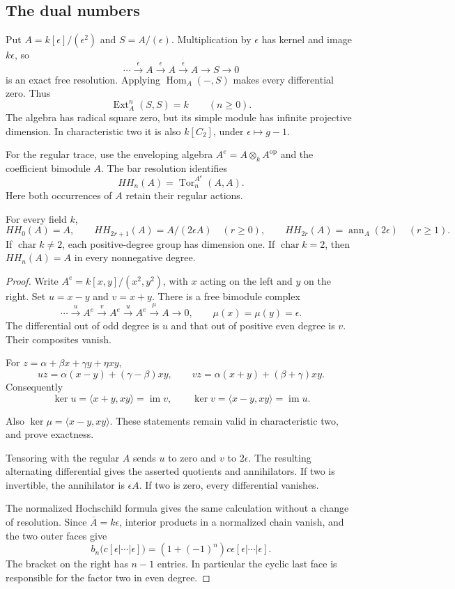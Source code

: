 \subsection{The dual numbers}

Put $A=k[\epsilon]/(\epsilon^2)$ and $S=A/(\epsilon)$. Multiplication by
$\epsilon$ has kernel and image $k\epsilon$, so
\[
 \cdots\xrightarrow{\epsilon} A\xrightarrow{\epsilon} A
 \xrightarrow{\epsilon} A\longrightarrow S\longrightarrow0
\]
is an exact free resolution. Applying $\operatorname{Hom}_A(-,S)$ makes
every differential zero. Thus
\[
 \operatorname{Ext}^n_A(S,S)=k\qquad(n\geq0).
\]
The algebra has radical square zero, but its simple module has infinite
projective dimension. In characteristic two it is also $k[C_2]$, under
$\epsilon\mapsto g-1$.

For the regular trace, use the enveloping algebra $A^e=A\otimes_k
A^{\mathrm{op}}$ and the coefficient bimodule $A$. The bar resolution
identifies
\[
 HH_n(A)=\operatorname{Tor}^{A^e}_n(A,A).
\]
Here both occurrences of $A$ retain their regular actions.

\begin{proposition}
\label{v4-arith:traces:dual-numbers}
For every field $k$,
\[
 HH_0(A)=A,\qquad
 HH_{2r+1}(A)=A/(2\epsilon A)\quad(r\geq0),\qquad
 HH_{2r}(A)=\operatorname{ann}_A(2\epsilon)\quad(r\geq1).
\]
If $\operatorname{char}k\ne2$, each positive-degree group has dimension one.
If $\operatorname{char}k=2$, then $HH_n(A)=A$ in every nonnegative degree.
\end{proposition}
\begin{proof}
Write $A^e=k[x,y]/(x^2,y^2)$, with $x$ acting on the left and $y$ on the
right. Set $u=x-y$ and $v=x+y$. There is a free bimodule complex
\[
 \cdots\xrightarrow{u}A^e\xrightarrow{v}A^e
 \xrightarrow{u}A^e\xrightarrow{\mu}A\longrightarrow0,
 \qquad \mu(x)=\mu(y)=\epsilon.
\]
The differential out of odd degree is $u$ and that out of positive even
degree is $v$. Their composites vanish.

For $z=\alpha+\beta x+\gamma y+\eta xy$,
\[
 uz=\alpha(x-y)+(\gamma-\beta)xy,\qquad
 vz=\alpha(x+y)+(\beta+\gamma)xy.
\]
Consequently
\[
 \ker u=\langle x+y,xy\rangle=\operatorname{im}v,\qquad
 \ker v=\langle x-y,xy\rangle=\operatorname{im}u.
\]

Also $\ker\mu=\langle x-y,xy\rangle$. These statements remain valid in
characteristic two, and prove exactness.

Tensoring with the regular $A$ sends $u$ to zero and $v$ to $2\epsilon$. The
resulting alternating differential gives the asserted quotients and
annihilators. If two is invertible, the annihilator is $\epsilon A$. If two
is zero, every differential vanishes.

The normalized Hochschild formula gives the same calculation without a
change of resolution. Since $\overline A=k\epsilon$, interior products in a
normalized chain vanish, and the two outer faces give
\[
 b_n\bigl(c[\epsilon|\cdots|\epsilon]\bigr)
  =(1+(-1)^n)c\epsilon[\epsilon|\cdots|\epsilon].
\]
The bracket on the right has $n-1$ entries. In particular the cyclic last
face is responsible for the factor two in even degree.
\end{proof}

